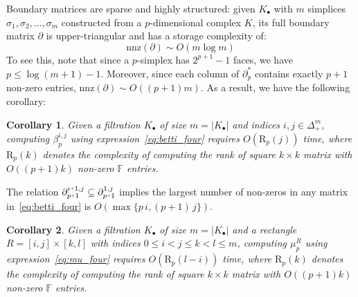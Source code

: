 \documentclass[10pt]{article}
\newcommand{\+}{%
	\raisebox{0.18ex}{\scaleobj{0.55}{+}}
}
\newtheorem{corollary}{Corollary}
\theoremstyle{definition}
\begin{document}
Boundary matrices are sparse and highly structured: given $K_\bullet$ with $m$ simplices $\sigma_1, \sigma_2, \dots, \sigma_m$ constructed from a $p$-dimensional complex $K$, its full boundary matrix $\partial$ is upper-triangular and has a storage complexity of: 
\begin{equation}
	\mathrm{nnz}(\partial) \sim O(m \log m)
\end{equation} 
To see this, note that since a $p$-simplex has $2^{p+1} - 1$ faces, we have $p \leq \log(m + 1) - 1$. Moreover, since each column of $\partial_p^\ast$ contains exactly $p+1$ non-zero entries, $\mathrm{nnz}(\partial) \sim O((p+1)m)$.
As a result, we have the following corollary:
\begin{corollary}
	Given a filtration $K_\bullet$ of size $m = \lvert K_\bullet \rvert$ and indices $i,j \in \Delta_+^m$, computing $\beta_p^{i,j}$ using expression~\eqref{eq:betti_four} requires $O(\mathrm{R}_{p}(j))$ time, where $\mathrm{R}_p(k)$ denotes the complexity of computing the rank of square $k \times k$ matrix with $O((p+1)k)$ non-zero $\mathbb{F}$ entries. 
\end{corollary} 
\noindent The relation $\partial_{p\+1}^{i \+ 1, j} \subseteq \partial_{p\+1}^{1, j}$ implies the largest number of non-zeros in any matrix in~\eqref{eq:betti_four} is $O(\max\{p\, i, (p+1)\,j\})$. %
\begin{corollary}
	Given a filtration $K_\bullet$ of size $m = \lvert K_\bullet \rvert$ and a rectangle $R = [i,j] \times [k,l]$ with indices $0 \leq i < j \leq k < l \leq m$, computing $\mu_p^{R}$ using expression~\eqref{eq:mu_four} requires $O(\mathrm{R}_{p}(l - i))$ time, where $\mathrm{R}_p(k)$ denotes the complexity of computing the rank of square $k \times k$ matrix with $O((p+1)k)$ non-zero $\mathbb{F}$ entries.
\end{corollary} 
\end{document}
